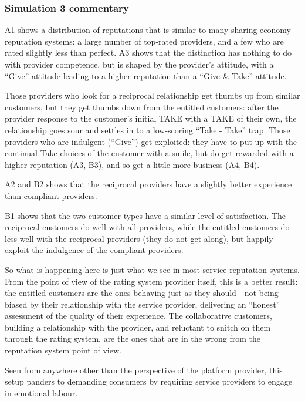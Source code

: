 \documentclass[
  letterpaper,
  DIV=11,
  numbers=noendperiod]{scrartcl}
\begin{document}
\hypertarget{simulation-3-commentary}{%
\subsubsection{Simulation 3 commentary}\label{simulation-3-commentary}}

A1 shows a distribution of reputations that is similar to many sharing
economy reputation systems: a large number of top-rated providers, and a
few who are rated slightly less than perfect. A3 shows that the
distinction has nothing to do with provider competence, but is shaped by
the provider's attitude, with a ``Give'' attitude leading to a higher
reputation than a ``Give \& Take'' attitude.

Those providers who look for a reciprocal relationship get thumbs up
from similar customers, but they get thumbs down from the entitled
customers: after the provider response to the customer's initial TAKE
with a TAKE of their own, the relationship goes sour and settles in to a
low-scoring ``Take - Take'' trap. Those providers who are indulgent
(``Give'') get exploited: they have to put up with the continual Take
choices of the customer with a smile, but do get rewarded with a higher
reputation (A3, B3), and so get a little more business (A4, B4).

A2 and B2 shows that the reciprocal providers have a slightly better
experience than compliant providers.

B1 shows that the two customer types have a similar level of
satisfaction. The reciprocal customers do well with all providers, while
the entitled customers do less well with the reciprocal providers (they
do not get along), but happily exploit the indulgence of the compliant
providers.

So what is happening here is just what we see in most service reputation
systems. From the point of view of the rating system provider itself,
this is a better result: the entitled customers are the ones behaving
just as they should - not being biased by their relationship with the
service provider, delivering an ``honest'' assessment of the quality of
their experience. The collaborative customers, building a relationship
with the provider, and reluctant to snitch on them through the rating
system, are the ones that are in the wrong from the reputation system
point of view.

Seen from anywhere other than the perspective of the platform provider,
this setup panders to demanding consumers by requiring service providers
to engage in emotional labour.
\end{document}
